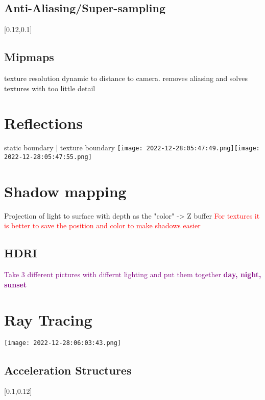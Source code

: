 \documentclass[main.tex,fontsize=12pt,paper=a4,paper=landscape,DIV=calc,]{scrartcl}
\begin{document}
\begin{multicols*}{4}
\subsection{Anti-Aliasing/Super-sampling}
[0.12,0.1]

\subsection{Mipmaps}
texture resolution dynamic to distance to camera.\newline
removes aliasing and solves textures with too little detail

\section{Reflections}
static boundary | texture boundary\newline
\texttt{[image: 2022-12-28:05:47:49.png]}\texttt{[image: 2022-12-28:05:47:55.png]}

\section{Shadow mapping}
Projection of light to surface with depth as the "color" -> Z buffer\newline
\textcolor{red}{For textures it is better to save the position and color to make shadows easier}

\subsection{HDRI}
\textcolor{purple}{Take 3 different pictures with differnt lighting and put them together\newline
\textbf{day, night, sunset}}

\section{Ray Tracing}
\texttt{[image: 2022-12-28:06:03:43.png]}

\subsection{Acceleration Structures}
[0.1,0.12]


\end{multicols*}
\end{document}
